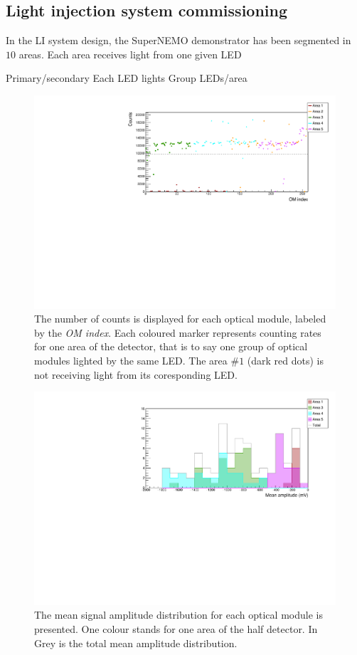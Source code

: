 \subsection{Light injection system commissioning}


In the LI system design, the SuperNEMO demonstrator has been segmented in $10$ areas.
Each area receives light from one given LED

Primary/secondary
Each LED lights
Group LEDs/area

\begin{figure}
  \centering
  \includegraphics[width=15cm]{commissioning/fig_commissioning/LI_1d_counts.pdf}
  \caption{The number of counts is displayed for each optical module, labeled by the \emph{OM index}.
    Each coloured marker represents counting rates for one area of the detector, that is to say one group of optical modules lighted by the same LED.
    The area \#$1$ (dark red dots) is not receiving light from its coresponding LED.
    \label{fig:LI_counts}}
\end{figure}


\begin{figure}
  \centering
  \includegraphics[width=15cm]{commissioning/fig_commissioning/LI_mean_ampl.pdf}
  \caption{The mean signal amplitude distribution for each optical module is presented.
    One colour stands for one area of the half detector.
    In Grey is the total mean amplitude distribution.
    \label{fig:LI_ampl}}
\end{figure}


